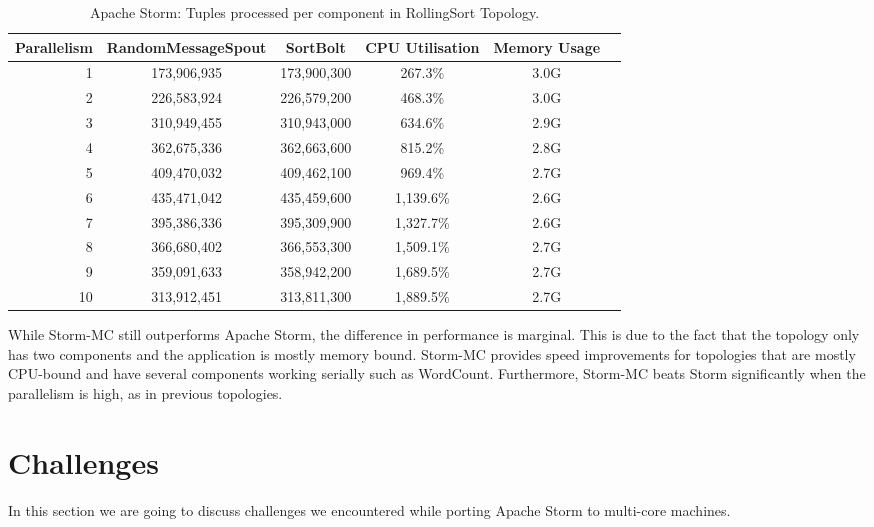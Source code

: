 \documentclass[bsc,logo,frontabs,twoside,singlespacing,normalheadings,parskip]{infthesis}\usepackage[]{graphicx}\usepackage[]{color}
\begin{document}
\begin{table}[!htb]
\begin{adjustwidth}{-0.5in}{-0.5in}
\centering
\small
\begin{tabular}{@{}rccccl@{}}
    {Parallelism} & {RandomMessageSpout} & {SortBolt} & {CPU Utilisation} & {Memory Usage} \\ \toprule
    1 & {173,906,935} & {173,900,300} & {267.3\%} & {3.0G} \\
    2 & {226,583,924} & {226,579,200} & {468.3\%} & {3.0G} \\
    3 & {310,949,455} & {310,943,000} & {634.6\%} & {2.9G} \\
    4 & {362,675,336} & {362,663,600} & {815.2\%} & {2.8G} \\
    5 & {409,470,032} & {409,462,100} & {969.4\%} & {2.7G} \\
    6 & {435,471,042} & {435,459,600} & {1,139.6\%} & {2.6G} \\
    7 & {395,386,336} & {395,309,900} & {1,327.7\%} & {2.6G} \\
    8 & {366,680,402} & {366,553,300} & {1,509.1\%} & {2.7G} \\
    9 & {359,091,633} & {358,942,200} & {1,689.5\%} & {2.7G} \\
    10 & {313,912,451} & {313,811,300} & {1,889.5\%} & {2.7G} \\
\end{tabular}
\caption{Apache Storm: Tuples processed per component in RollingSort Topology.}
\label{table:storm_rolling}
\end{adjustwidth}
\end{table}

While Storm-MC still outperforms Apache Storm, the difference in performance is marginal. This is due to the fact that the topology only has two components and the application is mostly memory bound. Storm-MC provides speed improvements for topologies that are mostly CPU-bound and have several components working serially such as WordCount. Furthermore, Storm-MC beats Storm significantly when the parallelism is high, as in previous topologies.

\section{Challenges}
\label{sec:challenges}

In this section we are going to discuss challenges we encountered while porting Apache Storm to multi-core machines.
\end{document}
